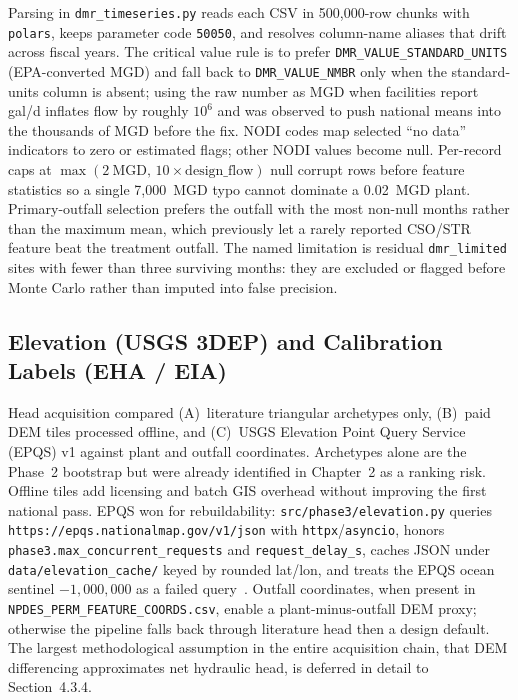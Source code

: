 \documentclass[12pt,letterpaper]{report}
\begin{document}
Parsing in \texttt{dmr\_timeseries.py} reads each CSV in 500{,}000-row chunks with
\texttt{polars}, keeps parameter code \texttt{50050}, and resolves column-name
aliases that drift across fiscal years. The critical value rule is to prefer
\texttt{DMR\_VALUE\_STANDARD\_UNITS} (EPA-converted MGD) and fall back to
\texttt{DMR\_VALUE\_NMBR} only when the standard-units column is absent; using the
raw number as MGD when facilities report gal/d inflates flow by roughly
$10^{6}$ and was observed to push national means into the thousands of MGD before
the fix. NODI codes map selected ``no data'' indicators to zero or estimated
flags; other NODI values become null. Per-record caps at
$\max(2~\mathrm{MGD},\,10\times\mathrm{design\_flow})$ null corrupt rows before
feature statistics so a single 7{,}000~MGD typo cannot dominate a 0.02~MGD plant.
Primary-outfall selection prefers the outfall with the most non-null months rather
than the maximum mean, which previously let a rarely reported CSO/STR feature beat
the treatment outfall. The named limitation is residual \texttt{dmr\_limited}
sites with fewer than three surviving months: they are excluded or flagged before
Monte Carlo rather than imputed into false precision.

\subsection{Elevation (USGS 3DEP) and Calibration Labels (EHA / EIA)}

Head acquisition compared (A)~literature triangular archetypes only, (B)~paid DEM
tiles processed offline, and (C)~USGS Elevation Point Query Service (EPQS) v1
against plant and outfall coordinates. Archetypes alone are the Phase~2 bootstrap
but were already identified in Chapter~2 as a ranking risk. Offline tiles add
licensing and batch GIS overhead without improving the first national pass.
EPQS won for rebuildability: \texttt{src/phase3/\allowbreak elevation.py} queries
\texttt{https://\allowbreak epqs.\allowbreak nationalmap.\allowbreak gov/\allowbreak v1/\allowbreak json} with \texttt{httpx}/\texttt{asyncio},
honors \texttt{phase3.\allowbreak max\_concurrent\_requests} and \texttt{request\_delay\_s},
caches JSON under \texttt{data/\allowbreak elevation\_cache/} keyed by rounded lat/lon, and
treats the EPQS ocean sentinel $-1{,}000{,}000$ as a failed query~\cite{usgs_3dep}.
Outfall coordinates, when present in
\texttt{NPDES\_PERM\_\allowbreak FEATURE\_\allowbreak COORDS.csv}, enable a plant-minus-outfall DEM proxy;
otherwise the pipeline falls back through literature head then a design default.
The largest methodological assumption in the entire acquisition chain, that DEM
differencing approximates net hydraulic head, is deferred in detail to
Section~4.3.4.
\end{document}
